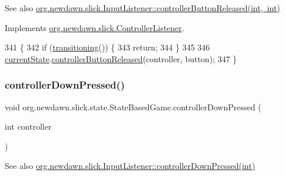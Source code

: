 \begin{DoxySeeAlso}{See also}
\mbox{\hyperlink{interfaceorg_1_1newdawn_1_1slick_1_1_controller_listener_a34020453a6c40e12b149c334a4adc246}{org.\+newdawn.\+slick.\+Input\+Listener\+::controller\+Button\+Released(int, int)}} 
\end{DoxySeeAlso}


Implements \mbox{\hyperlink{interfaceorg_1_1newdawn_1_1slick_1_1_controller_listener_a34020453a6c40e12b149c334a4adc246}{org.\+newdawn.\+slick.\+Controller\+Listener}}.


\begin{DoxyCode}
341                                                                      \{
342         \textcolor{keywordflow}{if} (\mbox{\hyperlink{classorg_1_1newdawn_1_1slick_1_1state_1_1_state_based_game_ae869c08778875776081935a090d4c92f}{transitioning}}()) \{
343             \textcolor{keywordflow}{return};
344         \}
345         
346         \mbox{\hyperlink{classorg_1_1newdawn_1_1slick_1_1state_1_1_state_based_game_a6a45e68094bb9b7ec30b8a8b7d415766}{currentState}}.\mbox{\hyperlink{interfaceorg_1_1newdawn_1_1slick_1_1_controller_listener_a34020453a6c40e12b149c334a4adc246}{controllerButtonReleased}}(controller, button);
347     \}
\end{DoxyCode}
\mbox{\label{classorg_1_1newdawn_1_1slick_1_1state_1_1_state_based_game_a3132de3950587a94bc059b40b5a7a703}} 
\subsubsection{\texorpdfstring{controller\+Down\+Pressed()}{controllerDownPressed()}}
{\footnotesize\ttfamily void org.\+newdawn.\+slick.\+state.\+State\+Based\+Game.\+controller\+Down\+Pressed (\begin{DoxyParamCaption}\item[{int}]{controller }\end{DoxyParamCaption})\hspace{0.3cm}{\ttfamily [inline]}}

\begin{DoxySeeAlso}{See also}
\mbox{\hyperlink{interfaceorg_1_1newdawn_1_1slick_1_1_controller_listener_a9c619e7cb29b3c8b68bc24f9a4e238d7}{org.\+newdawn.\+slick.\+Input\+Listener\+::controller\+Down\+Pressed(int)}} 
\end{DoxySeeAlso}


